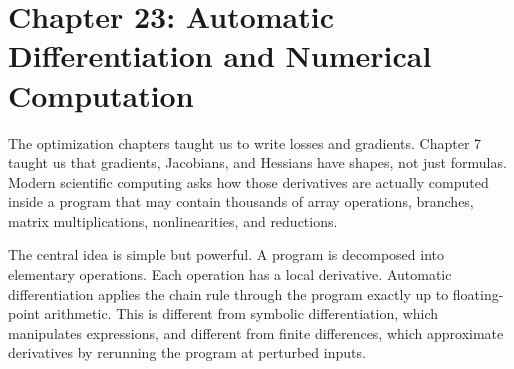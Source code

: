 \section{Chapter 23: Automatic Differentiation and Numerical Computation}
\label{ch:automatic-differentiation-numerical-computation}

The optimization chapters taught us to write losses and gradients. Chapter 7 taught us that gradients, Jacobians, and Hessians have shapes, not just formulas. Modern scientific computing asks how those derivatives are actually computed inside a program that may contain thousands of array operations, branches, matrix multiplications, nonlinearities, and reductions.

The central idea is simple but powerful. A program is decomposed into elementary operations. Each operation has a local derivative. Automatic differentiation applies the chain rule through the program exactly up to floating-point arithmetic. This is different from symbolic differentiation, which manipulates expressions, and different from finite differences, which approximate derivatives by rerunning the program at perturbed inputs.

